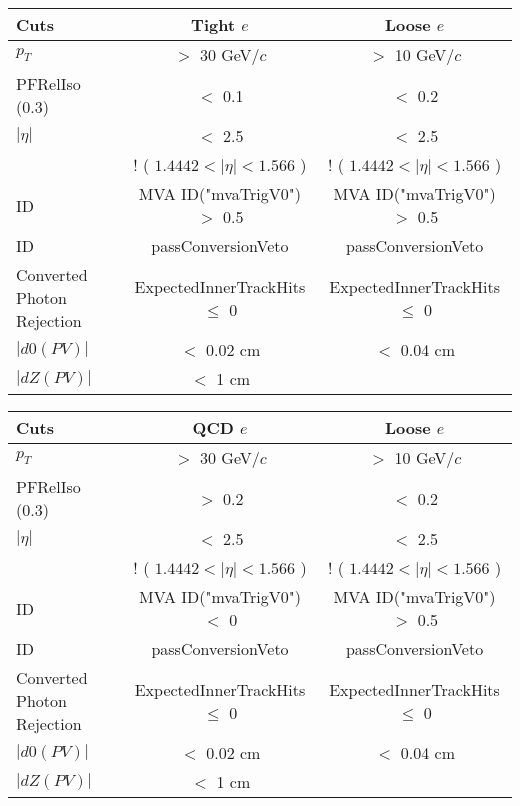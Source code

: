 \documentclass[landscape]{article}
\begin{document}
\begin{small}
  
  \begin{center}

    \begin{tabular}{ | l | c | c | }
      \hline \hline
      Cuts & Tight $e$ & Loose $e$ \\ \hline
      $p_{T}$ & $>$ 30 GeV/$c$ & $>$ 10 GeV/$c$ \\ \hline
      PFRelIso (0.3) & $<$ 0.1 & $<$ 0.2 \\ \hline
      $|\eta|$ & $<$ 2.5 & $<$ 2.5 \\
       & ! ( $1.4442 < |\eta| < 1.566$ ) & ! ( $1.4442 < |\eta| < 1.566$ ) \\ \hline
      ID & MVA ID("mvaTrigV0") $>$ 0.5 & MVA ID("mvaTrigV0") $>$ 0.5 \\ \hline
      ID & passConversionVeto & passConversionVeto \\ \hline
      Converted Photon Rejection & ExpectedInnerTrackHits $\leq$ 0 & ExpectedInnerTrackHits $\leq$ 0 \\ \hline
      $|d0(PV)|$ & $<$ 0.02 cm & $<$ 0.04 cm \\ \hline
      $|dZ(PV)|$ & $<$ 1 cm & \\
      \hline \hline
    \end{tabular}

    \vspace{10 mm}

    \begin{tabular}{ | l | c | c | }
      \hline \hline
      Cuts & QCD $e$ & Loose $e$ \\ \hline
      $p_{T}$ & $>$ 30 GeV/$c$ & $>$ 10 GeV/$c$ \\ \hline
      PFRelIso (0.3) & $>$ 0.2 & $<$ 0.2 \\ \hline
      $|\eta|$ & $<$ 2.5 & $<$ 2.5 \\
       & ! ( $1.4442 < |\eta| < 1.566$ ) & ! ( $1.4442 < |\eta| < 1.566$ ) \\ \hline
      ID & MVA ID("mvaTrigV0") $<$ 0 & MVA ID("mvaTrigV0") $>$ 0.5 \\ \hline
      ID & passConversionVeto & passConversionVeto \\ \hline
      Converted Photon Rejection & ExpectedInnerTrackHits $\leq$ 0 & ExpectedInnerTrackHits $\leq$ 0 \\ \hline
      $|d0(PV)|$ & $<$ 0.02 cm & $<$ 0.04 cm \\ \hline
      $|dZ(PV)|$ & $<$ 1 cm & \\
      \hline \hline
    \end{tabular}


\end{center}
\end{small}
\end{document}
